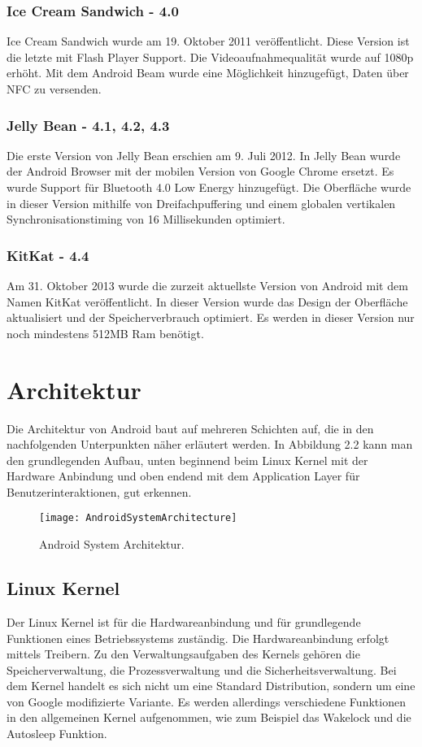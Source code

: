 \subsubsection{Ice Cream Sandwich - 4.0}
Ice Cream Sandwich wurde am 19. Oktober 2011 veröffentlicht. Diese Version ist die letzte mit Flash Player Support. Die Videoaufnahmequalität wurde auf 1080p erhöht. Mit dem Android Beam wurde eine Möglichkeit hinzugefügt, Daten über NFC zu versenden.\cite{16}

\subsubsection{Jelly Bean - 4.1, 4.2, 4.3}
Die erste Version von Jelly Bean erschien am 9. Juli 2012. In Jelly Bean wurde der Android Browser mit der mobilen Version von Google Chrome ersetzt. Es wurde Support für Bluetooth 4.0 Low Energy hinzugefügt. Die Oberfläche wurde in dieser Version mithilfe von Dreifachpuffering  und einem globalen vertikalen Synchronisationstiming von 16 Millisekunden optimiert.\cite{17}

\subsubsection{KitKat - 4.4}
Am 31. Oktober 2013 wurde die zurzeit aktuellste Version von Android mit dem Namen KitKat veröffentlicht. In dieser Version wurde das Design der Oberfläche aktualisiert und der Speicherverbrauch optimiert. Es werden in dieser Version nur noch mindestens 512MB Ram benötigt.\cite{18}


\section{Architektur}
Die Architektur von Android baut auf mehreren Schichten auf, die in den nachfolgenden Unterpunkten näher erläutert werden. In Abbildung 2.2 kann man den grundlegenden Aufbau, unten beginnend beim Linux Kernel mit der Hardware Anbindung und oben endend mit dem Application Layer für Benutzerinteraktionen, gut erkennen.

\begin{figure}
\centering
\texttt{[image: AndroidSystemArchitecture]}
\caption{Android System Architektur.\cite{19}}
\label{fig:AndroidSystemArchitecture}
\end{figure}

\subsection{Linux Kernel}
Der Linux Kernel ist für die Hardwareanbindung und für grundlegende Funktionen eines Betriebssystems zuständig. Die Hardwareanbindung erfolgt mittels Treibern. Zu den Verwaltungsaufgaben des Kernels gehören die Speicherverwaltung, die Prozessverwaltung und die Sicherheitsverwaltung. Bei dem Kernel handelt es sich nicht um eine Standard Distribution, sondern um eine von Google modifizierte Variante. Es werden allerdings verschiedene Funktionen in den allgemeinen Kernel aufgenommen, wie zum Beispiel das Wakelock und die Autosleep Funktion.\cite{19}


